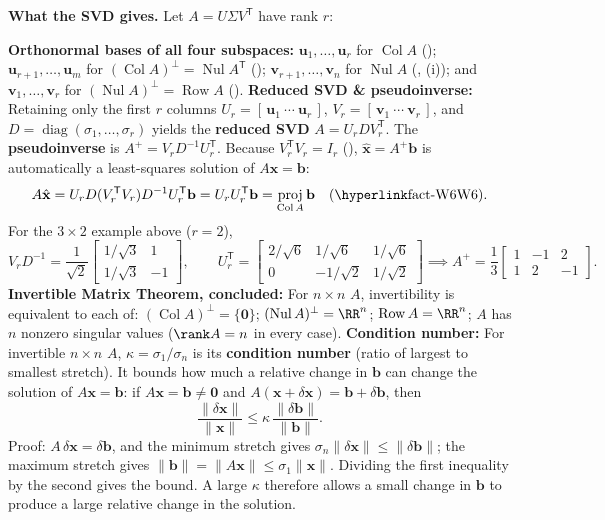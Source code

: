 \documentclass[10pt]{scrartcl}
\newcommand{\vv}[1]{\mathbf{#1}}
\DeclareMathOperator{\Nul}{Nul}
\DeclareMathOperator{\Col}{Col}
\DeclareMathOperator{\Row}{Row}
\DeclareMathOperator{\proj}{proj}
\begin{document}
\noindent\textbf{What the SVD gives.} Let $A=U\Sigma V^{\mathsf T}$ have rank $r$:
\begin{itemize}
  \ii \textbf{Orthonormal bases of all four subspaces:} $\vv u_1,\dots,\vv u_r$ for $\Col A$ (); $\vv u_{r+1},\dots,\vv u_m$ for $(\Col A)^\perp=\Nul A^{\mathsf T}$ (); $\vv v_{r+1},\dots,\vv v_n$ for $\Nul A$ (, (i)); and $\vv v_1,\dots,\vv v_r$ for $(\Nul A)^\perp=\Row A$ ().
  \ii \textbf{Reduced SVD \& pseudoinverse:} Retaining only the first $r$ columns $U_r=[\,\vv u_1\ \cdots\ \vv u_r\,]$, $V_r=[\,\vv v_1\ \cdots\ \vv v_r\,]$, and $D=\operatorname{diag}(\sigma_1,\dots,\sigma_r)$ yields the \textbf{reduced SVD} $A=U_r D V_r^{\mathsf T}$. The \textbf{pseudoinverse} is $A^+=V_r D^{-1} U_r^{\mathsf T}$. Because $V_r^{\mathsf T}V_r=I_r$ (), $\hat{\vv x}=A^+\vv b$ is automatically a least-squares solution of $A\vv x=\vv b$:
  \[
    A\hat{\vv x} = U_r D(V_r^{\mathsf T}V_r)D^{-1}U_r^{\mathsf T}\vv b = U_r U_r^{\mathsf T}\vv b = \proj_{\Col A}\vv b\quad\text{(\ilink{fact-W6}{W6})}.
  \]
  For the $3\times 2$ example above ($r=2$),
  \[
    V_rD^{-1} = \frac{1}{\sqrt{2}}\begin{bmatrix}1/\sqrt{3}&1\\1/\sqrt{3}&-1\end{bmatrix},\qquad
    U_r^{\mathsf T} = \begin{bmatrix}2/\sqrt{6}&1/\sqrt{6}&1/\sqrt{6}\\0&-1/\sqrt{2}&1/\sqrt{2}\end{bmatrix}
    \implies A^+ = \frac13\begin{bmatrix}1&-1&2\\1&2&-1\end{bmatrix}.
  \]
  \ii \textbf{Invertible Matrix Theorem, concluded:} For $n\times n$ $A$, invertibility is equivalent to each of: $(\Col A)^\perp=\{\vv 0\}$; $(\Nul A)^\perp=\RR^n$; $\Row A=\RR^n$; $A$ has $n$ nonzero singular values ($\rank A=n$ in every case).
  \ii \textbf{Condition number:} For invertible $n\times n$ $A$, $\kappa=\sigma_1/\sigma_n$ is its \textbf{condition number} (ratio of largest to smallest stretch). It bounds how much a relative change in $\vv b$ can change the solution of $A\vv x=\vv b$: if $A\vv x=\vv b\neq\vv 0$ and $A(\vv x+\delta\vv x)=\vv b+\delta\vv b$, then
  \[
    \frac{\|\delta\vv x\|}{\|\vv x\|}\le\kappa\,\frac{\|\delta\vv b\|}{\|\vv b\|}.
  \]
  Proof: $A\,\delta\vv x=\delta\vv b$, and the minimum stretch gives $\sigma_n\|\delta\vv x\|\le\|\delta\vv b\|$; the maximum stretch gives $\|\vv b\|=\|A\vv x\|\le\sigma_1\|\vv x\|$. Dividing the first inequality by the second gives the bound. A large $\kappa$ therefore allows a small change in $\vv b$ to produce a large relative change in the solution.
\end{itemize}
\end{document}
